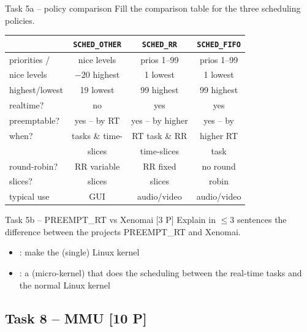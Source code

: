 \begin{example2}{Task 5a -- policy comparison}
    Fill the comparison table for the three scheduling policies.
    \tcblower
    {\footnotesize\setlength{\tabcolsep}{4pt}%
    \begin{tabular}{l|c|c|c}
         & \texttt{SCHED\_OTHER} & \texttt{SCHED\_RR} & \texttt{SCHED\_FIFO} \\\hline
        priorities / & nice levels & prios 1--99 & prios 1--99 \\
        nice levels & $-20$ highest & 1 lowest & 1 lowest \\
        highest/lowest & 19 lowest & 99 highest & 99 highest \\\hline
        realtime? & no & yes & yes \\\hline
        preemptable? & yes -- by RT & yes -- by higher & yes -- by \\
        when? & tasks \& time- & RT task \& RR & higher RT \\
         & slices & time-slices & task \\\hline
        round-robin? & RR variable & RR fixed & no round \\
        slices? & slices & slices & robin \\\hline
        typical use & GUI & audio/video & audio/video \\
    \end{tabular}}
\end{example2}

\begin{example2}{Task 5b -- PREEMPT\_RT vs Xenomai [3 P]}
    Explain in $\leq$3 sentences the difference between the projects PREEMPT\_RT and
    Xenomai.
    \tcblower
    \begin{itemize}
        \item {}: make the (single) Linux kernel 
        \item {}: a  (micro-kernel) that does the
              scheduling between the real-time tasks and the normal Linux kernel
    \end{itemize}
\end{example2}

\subsection{Task 8 -- MMU [10 P]}

